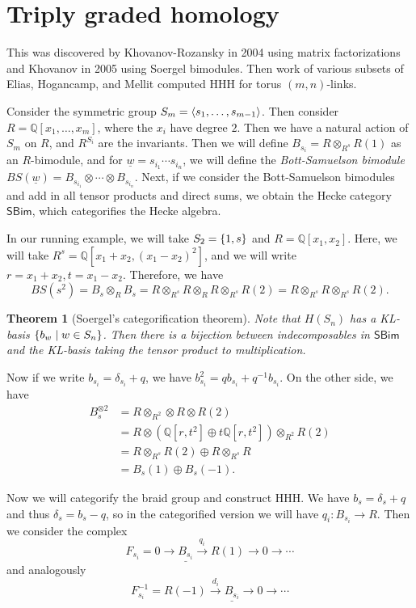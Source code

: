 \documentclass[leqno, openany]{memoir}
\newtheorem{thm}{Theorem}[section]
\theoremstyle{definition}
\theoremstyle{remark}
\theoremstyle{plain}
\theoremstyle{definition}
\theoremstyle{remark}
\newcommand{\Q}{\mathbb{Q}}
\newcommand{\ms}[1]{\mathsf{#1}}
\newcommand{\ul}[1]{\underline{#1}}
\begin{document}
\section{Triply graded homology}%
\label{sec:triply_graded_homology}

This was discovered by Khovanov-Rozansky in 2004 using matrix factorizations and Khovanov in 2005 using Soergel bimodules. Then work of various subsets of Elias, Hogancamp, and Mellit computed HHH for torus $(m,n)$-links.

Consider the symmetric group $S_m = \ev{s_1, \ldots, s_{m-1}}$. Then consider $R = \Q[x_1, \ldots, x_m]$, where the $x_i$ have degree $2$. Then we have a natural action of $S_m$ on $R$, and $R^{S_i}$ are the invariants. Then we will define $B_{s_i} = R \otimes_{R^s} R(1)$ as an $R$-bimodule, and for $\ul{w} = s_{i_1} \cdots s_{i_n}$, we will define the \textit{Bott-Samuelson bimodule} $BS(\ul{w}) = B_{s_{i_1}} \otimes \cdots \otimes B_{s_{i_n}}$. Next, if we consider the Bott-Samuelson bimodules and add in all tensor products and direct sums, we obtain the Hecke category $\ms{SBim}$, which categorifies the Hecke algebra.

In our running example, we will take $S_2 = \qty{1, s}$ and $R = \Q[x_1, x_2]$. Here, we will take $R^s = \Q[x_1+x_2, (x_1-x_2)^2]$, and we will write $r = x_1+x_2, t = x_1-x_2$. Therefore, we have
\[ BS(s^2) = B_s \otimes_R B_s = R \otimes_{R^s} R \otimes_R R \otimes_{R^s} R(2) = R \otimes_{R^s} R \otimes_{R^s} R(2). \]

\begin{thm}[Soergel's categorification theorem]
    Note that $H(S_n)$ has a KL-basis $\qty{b_w \mid w \in S_n}$. Then there is a bijection between indecomposables in $\ms{SBim}$ and the KL-basis taking the tensor product to multiplication.
\end{thm}

Now if we write $b_{s_i} = \delta_{s_i} + q$, we have $b_{s_i}^2 = q b_{s_i} + q^{-1} b_{s_i}$. On the other side, we have
\begin{align*}
    B_s^{\otimes 2} &= R \otimes_{R^2} \otimes R \otimes R(2) \\
    &= R \otimes (\Q[r,t^2] \oplus t \Q[r,t^2]) \otimes_{R^2} R(2) \\
    &= R \otimes_{R^s} R(2) \oplus R \otimes_{R^s} R \\
    &= B_s(1) \oplus B_s(-1).
\end{align*}

Now we will categorify the braid group and construct HHH. We have $b_s = \delta_s + q$ and thus $\delta_s = b_s - q$, so in the categorified version we will have $q_i \colon B_{s_i} \to R$. Then we consider the complex
\[ F_{s_i} = 0 \to \ul{B_{s_i}} \xrightarrow{q_i} R(1) \to 0 \to \cdots \]
and analogously
\[ F_{s_i}^{-1} = R(-1) \xrightarrow{d_i} \ul{B_{s_i}} \to 0 \to \cdots \]
\end{document}
